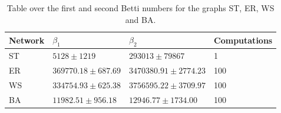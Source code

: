 \documentclass[oneside,a4paper,12pt, DIV=calc]{scrbook}
\theoremstyle{definition}
\begin{document}
\begin{table}[ht]
\centering
\begin{tabular}{*4l}    \toprule
  Network & $\beta_{1} $  & $\beta_{2}$  & Computations \\ \toprule
  ST &   $5128 \pm 1219$ & $293013 \pm 79867$ & 1 \\
  ER &  $369770.18 \pm 687.69$ & $3470380.91 \pm 2774.23$ & 100 \\
  WS & $334754.93 \pm 625.38$ & $3756595.22 \pm 3709.97$ & 100 \\
  BA &  $11982.51 \pm 956.18$ & $12946.77  \pm 1734.00$ & 100
  \\
  \bottomrule
\end{tabular}
\caption{\label{bettis} Table over the first and second Betti numbers for the graphs ST, ER, WS and BA.}
\end{table}
\end{document}
